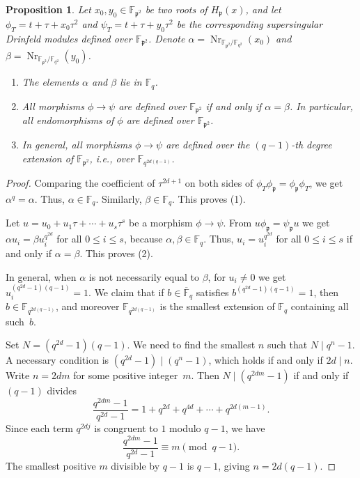 \documentclass[12pt]{amsart}
\newtheorem{prop}[thm]{Proposition}
\theoremstyle{definition}
\theoremstyle{remark}
\numberwithin{equation}{section}
\numberwithin{thm}{section}
\DeclareMathOperator{\Nr}{Nr}
\newcommand{\fp}{\mathfrak{p}}
\newcommand{\F}{\mathbb{F}}
\newcommand{\oF}{\overline{\F}}
\begin{document}
	\begin{prop}\label{lemLegendre}
		Let $x_0, y_0\in \F_{\fp^2}$ be two roots of $H_\fp(x)$, and let
		$\phi_T=t+\tau+x_0\tau^2$ and $\psi_T=t+\tau+y_0\tau^2$
		be the corresponding supersingular Drinfeld modules defined over $\F_{\fp^2}$.
		Denote $\alpha = \Nr_{\F_{\fp^2}/\F_{q^2}}(x_0)$ and $\beta=\Nr_{\F_{\fp^2}/\F_{q^2}}(y_0)$.
		\begin{enumerate}
			\item The elements $\alpha$ and $\beta$ lie in $\F_q$.
			\item All morphisms $\phi\to \psi$ are defined over $\F_{\fp^2}$ if and only if $\alpha=\beta$. In particular, all
			endomorphisms of $\phi$ are defined over $\F_{\fp^2}$.
			\item In general, all morphisms $\phi\to \psi$ are defined over the $(q-1)$-th degree extension of $\F_{\fp^2}$, i.e., over $\F_{q^{2d(q-1)}}$.
		\end{enumerate}
	\end{prop}
	\begin{proof}
		Comparing
		the coefficient of $\tau^{2d+1}$ on both sides of $\phi_T\phi_\fp=\phi_\fp\phi_T$, we get $\alpha^q=\alpha$.
		Thus, $\alpha\in \F_q$. Similarly, $\beta\in \F_q$. This proves (1).
		
		Let $u=u_0+u_1\tau+\cdots+u_s\tau^s$ be a morphism $\phi\to \psi$.
		From $u \phi_\fp = \psi_\fp u$ we get $\alpha u_i = \beta u_i^{q^{2d}}$ for all $0\leq i\leq s$, because $\alpha, \beta\in \F_q$.
		Thus,  $u_i = u_i^{q^{2d}}$ for all $0\leq i\leq s$ if and only if $\alpha=\beta$. This proves (2).
		
		In general, when $\alpha$ is not necessarily equal to $\beta$, for $u_i\neq 0$ we get $u_i^{(q^{2d}-1)(q-1)}=1$.
		We claim that if $b\in \oF_q$ satisfies $b^{(q^{2d}-1)(q-1)}=1$,
		then $b \in \F_{q^{2d(q-1)}}$, and moreover $\F_{q^{2d(q-1)}}$ is the smallest extension of
		$\F_q$ containing all such~$b$.
		
		Set $N = (q^{2d}-1)(q-1)$.  We need to find the smallest $n$ such that
		$N \mid q^n - 1$. A necessary condition is
		$(q^{2d}-1) \mid (q^n-1)$, which holds if and only if $2d \mid n$.
		Write $n = 2dm$ for some positive integer~$m$.  Then $N \mid (q^{2dm}-1)$ if and only if $(q-1)$ divides
		\[
		\frac{q^{2dm}-1}{q^{2d}-1} = 1 + q^{2d} + q^{4d} + \cdots + q^{2d(m-1)}.
		\]
		Since each term $q^{2dj}$ is congruent to $1$ modulo $q-1$, we have
		\[
		\frac{q^{2dm}-1}{q^{2d}-1} \equiv m \pmod{q-1}.
		\]
		The smallest positive $m$ divisible by $q-1$ is $q-1$, giving $n = 2d(q-1)$.
	\end{proof}
	
\end{document}
